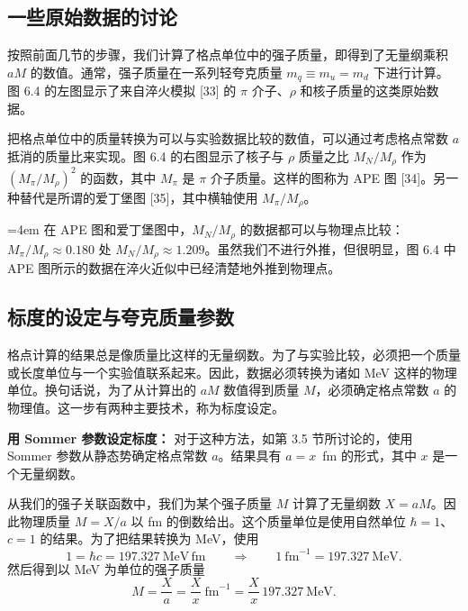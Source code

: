 \subsection{一些原始数据的讨论}

按照前面几节的步骤，我们计算了格点单位中的强子质量，即得到了无量纲乘积 $aM$ 的数值。通常，强子质量在一系列轻夸克质量 $m_q \equiv m_u = m_d$ 下进行计算。图 6.4 的左图显示了来自淬火模拟 [33] 的 $\pi$ 介子、$\rho$ 和核子质量的这类原始数据。

把格点单位中的质量转换为可以与实验数据比较的数值，可以通过考虑格点常数 $a$ 抵消的质量比来实现。图 6.4 的右图显示了核子与 $\rho$ 质量之比 $M_N/M_\rho$ 作为 $(M_\pi/M_\rho)^2$ 的函数，其中 $M_\pi$ 是 $\pi$ 介子质量。这样的图称为 APE 图 [34]。另一种替代是所谓的爱丁堡图 [35]，其中横轴使用 $M_\pi/M_\rho$。

\begingroup\emergencystretch=4em 在 APE 图和爱丁堡图中，$M_N/M_\rho$ 的数据都可以与物理点比较：\linebreak[0] $M_\pi/M_\rho \approx 0.180$ 处 $M_N/M_\rho \approx 1.209$。虽然我们不进行外推，但很明显，图 6.4 中 APE 图所示的数据在淬火近似中已经清楚地外推到物理点。\par\endgroup

\subsection{标度的设定与夸克质量参数}

格点计算的结果总是像质量比这样的无量纲数。为了与实验比较，必须把一个质量或长度单位与一个实验值联系起来。因此，数据必须转换为诸如 MeV 这样的物理单位。换句话说，为了从计算出的 $aM$ 数值得到质量 $M$，必须确定格点常数 $a$ 的物理值。这一步有两种主要技术，称为标度设定。

\textbf{用 Sommer 参数设定标度：} 对于这种方法，如第 3.5 节所讨论的，使用 Sommer 参数从静态势确定格点常数 $a$。结果具有 $a = x$~fm 的形式，其中 $x$ 是一个无量纲数。

从我们的强子关联函数中，我们为某个强子质量 $M$ 计算了无量纲数 $X = aM$。因此物理质量 $M = X/a$ 以 fm 的倒数给出。这个质量单位是使用自然单位 $\hbar = 1$、$c = 1$ 的结果。为了把结果转换为 MeV，使用
\begin{equation}
  1 = \hbar c = 197.327\ \mathrm{MeV\,fm}
  \qquad\Longrightarrow\qquad
  1\ \mathrm{fm}^{-1} = 197.327\ \mathrm{MeV} .
\end{equation}
然后得到以 MeV 为单位的强子质量
\begin{equation}
  M = \frac{X}{a} = \frac{X}{x}\ \mathrm{fm}^{-1} = \frac{X}{x}\,
    197.327\ \mathrm{MeV} .
\end{equation}

